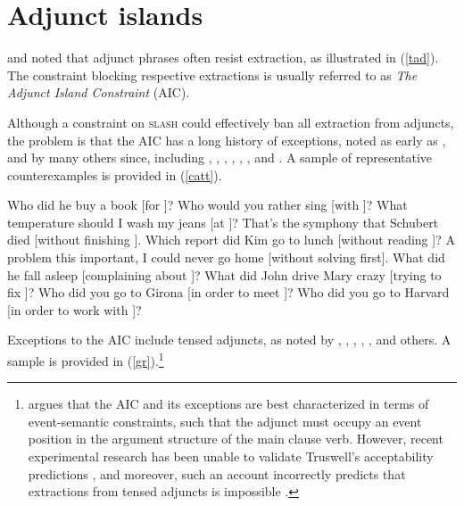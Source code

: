 \documentclass[output=paper
 	        ,biblatex
                ,babelshorthands
                ,newtxmath
                ,draftmode
                ,colorlinks, citecolor=brown
]{langscibook}
\begin{document}
\section{Adjunct islands}

\citet{cattell} and \citet{huang82} noted that adjunct phrases often resist extraction, as
illustrated in (\ref{tad}). The constraint blocking respective extractions is usually referred to as
\emph{The Adjunct Island Constraint} (AIC).

\eal  \label{tad}
\zl

Although a constraint on \textsc{slash} could effectively ban all extraction from adjuncts, the problem
is that the AIC has a long history of exceptions, noted as early as \citet[38]{cattell}, and by many
others since, including \citet[72]{chomsky82}, \citet{engdahl}, \citet[103]{hegarty90},
\citet[139]{cinque}, \citet[191]{pollardsag}, \citet[253]{culicover87}, and \citet[]{borg}. A sample of
representative counterexamples is provided in (\ref{catt}).


\ealnoraggedright \label{catt}
\ex Who did he buy a book [for \spc]?
\ex Who would you rather sing [with \spc]?
\ex What temperature should I wash my jeans [at \spc]?
\ex That's the symphony that Schubert died [without finishing \spc].
\ex Which report did Kim go to lunch [without reading \spc]?
\ex A problem this important, I could never go home [without solving \spcs first].
\ex What did he fall asleep [complaining about \spc]?
\ex What did John drive Mary crazy [trying to fix \spc]?
\ex Who did you go to Girona [in order to meet \spc]?
\ex Who did you go to Harvard [in order to work with \spc]?
\zl


Exceptions to the AIC include tensed adjuncts, as noted by \citet[88]{grosu81}, \citet[29]{deane}, \citet[287]{levhubook}, \citet[144]{gold06}, \citet[471]{chavesextr}, \citet[175,
ft.\,1]{truswellbook} and others. A sample is provided in (\ref{gr}).\footnote{\citet{truswellbook}
  argues that the AIC and its exceptions are best characterized in terms of event-semantic
  constraints, such that the adjunct must occupy an event position in the argument structure of the
  main clause verb. However, recent experimental research has been unable to validate Truswell's
  acceptability predictions \citep{kohrt}, and moreover, such an account incorrectly predicts that
  extractions from tensed adjuncts is impossible \citep[175, ft.\,1]{truswellbook}.}
 
\end{document}

